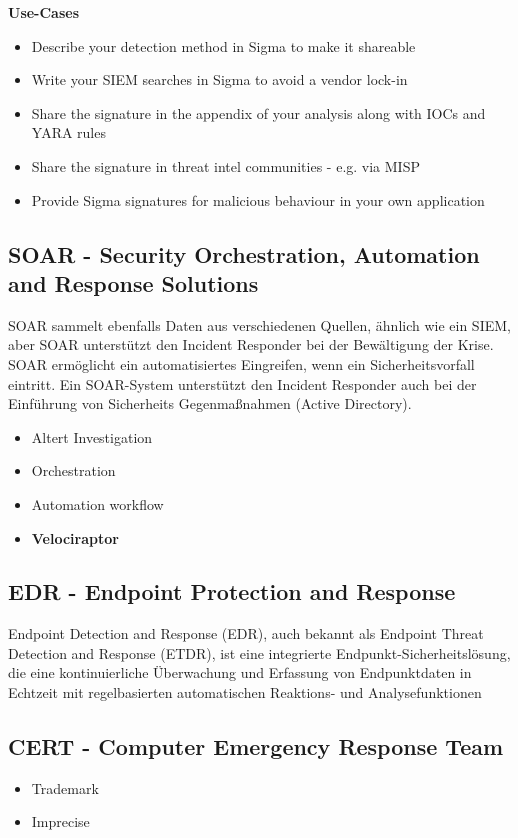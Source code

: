 \textbf{Use-Cases}
\begin{itemize}
    \item Describe your detection method in Sigma to make it shareable
    \item Write your SIEM searches in Sigma to avoid a vendor lock-in
    \item Share the signature in the appendix of your analysis along with IOCs and YARA rules
    \item Share the signature in threat intel communities - e.g. via MISP
    \item Provide Sigma signatures for malicious behaviour in your own application
\end{itemize}

\subsection{SOAR - Security Orchestration, Automation and Response Solutions}
SOAR sammelt ebenfalls Daten aus verschiedenen Quellen, ähnlich wie ein SIEM, aber SOAR unterstützt den Incident Responder bei der Bewältigung der Krise. SOAR ermöglicht ein automatisiertes Eingreifen, wenn ein Sicherheitsvorfall eintritt. Ein SOAR-System unterstützt den Incident Responder auch bei der Einführung von Sicherheits Gegenmaßnahmen (Active Directory).\\

\begin{itemize}
    \item Altert Investigation
    \item Orchestration
    \item Automation workflow
    \item \textbf{Velociraptor}
\end{itemize}

\subsection{EDR - Endpoint Protection and Response}
Endpoint Detection and Response (EDR), auch bekannt als Endpoint Threat Detection and Response (ETDR), ist eine integrierte Endpunkt-Sicherheitslösung, die eine kontinuierliche Überwachung und Erfassung von Endpunktdaten in Echtzeit mit regelbasierten automatischen Reaktions- und Analysefunktionen

\subsection{CERT - Computer Emergency Response Team}
\begin{itemize}
    \item Trademark
    \item Imprecise
\end{itemize}

